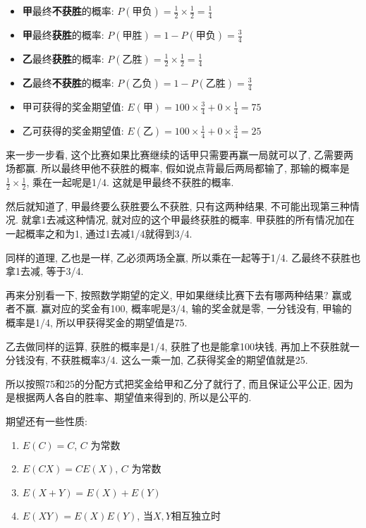 \begin{itemize}
  \item \textbf{甲}最终\textbf{不获胜}的概率: $P(\mbox{甲负}) = \frac{1}{2} \times \frac{1}{2} = \frac{1}{4} $
  \item \textbf{甲}最终\textbf{获胜}的概率: $P(\mbox{甲胜}) = 1 - P(\mbox{甲负}) = \frac{3}{4}$ 
  \item \textbf{乙}最终\textbf{获胜}的概率: $P(\mbox{乙胜})  = \frac{1}{2} \times \frac{1}{2} = \frac{1}{4}$ 
  \item \textbf{乙}最终\textbf{不获胜}的概率: $P(\mbox{乙负}) = 1 - P(\mbox{乙胜})  = \frac{3}{4}$ 
  \item 甲可获得的奖金期望值: $E(\mbox{甲}) = 100 \times \frac{3}{4} + 0 \times \frac{1}{4} = 75$ 
  \item 乙可获得的奖金期望值: $E(\mbox{乙}) = 100 \times \frac{1}{4} + 0 \times \frac{3}{4} = 25$
\end{itemize}

来一步一步看, 这个比赛如果比赛继续的话甲只需要再赢一局就可以了, 乙需要两场都赢. 所以最终甲他不获胜的概率, 假如说点背最后两局都输了, 那输的概率是$\frac{1}{2} \times \frac{1}{2}$, 乘在一起呢是1/4. 这就是甲最终不获胜的概率. 

然后就知道了, 甲最终要么获胜要么不获胜, 只有这两种结果, 不可能出现第三种情况. 就拿1去减这种情况, 就对应的这个甲最终获胜的概率. 甲获胜的所有情况加在一起概率之和为1, 通过1去减1/4就得到3/4. 

同样的道理, 乙也是一样, 乙必须两场全赢, 所以乘在一起等于1/4. 乙最终不获胜也拿1去减, 等于3/4. 

再来分别看一下, 按照数学期望的定义, 甲如果继续比赛下去有哪两种结果? 赢或者不赢. 赢对应的奖金有100, 概率呢是3/4, 输的奖金就是零, 一分钱没有, 甲输的概率是1/4, 所以甲获得奖金的期望值是75. 

乙去做同样的运算, 获胜的概率是1/4, 获胜了也是能拿100块钱, 再加上不获胜就一分钱没有, 不获胜概率3/4. 这么一乘一加, 乙获得奖金的期望值就是25. 

所以按照75和25的分配方式把奖金给甲和乙分了就行了, 而且保证公平公正, 因为是根据两人各自的胜率、期望值来得到的, 所以是公平的. 

期望还有一些性质:

\begin{enumerate}
  \item $E(C) = C$, $C$ 为常数 
  \item $E(CX) = CE(X)$, $C$ 为常数 
  \item $E(X+Y) = E(X) + E(Y)$ 
  \item $E(XY) = E(X)E(Y)$,  当$X,Y$相互独立时
\end{enumerate}

